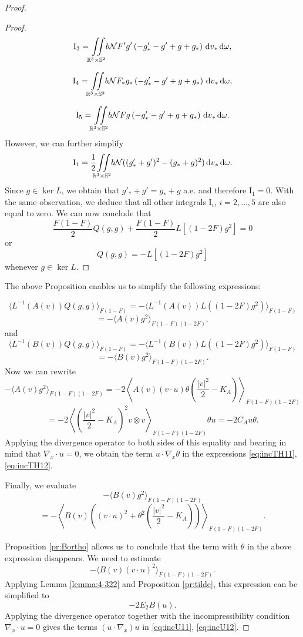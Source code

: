 \begin{proof}
\begin{proof}
    \[\mathrm I_3 = {\iint\limits_{\mathbb R^3\times\mathbb S^2}} b {\mathcal {N}} F' g'  \left(-g'_\ast-g'  +g +g_\ast\right){\,\mathrm{d} v}_\ast{\,\mathrm{d} \omega},   \]

      \[\mathrm I_4 = {\iint\limits_{\mathbb R^3\times\mathbb S^2}} b {\mathcal {N}} F_\ast g_\ast   \left(-g'_\ast-g'  +g +g_\ast\right){\,\mathrm{d} v}_\ast{\,\mathrm{d} \omega} ,  \]

        \[\mathrm I_5 = {\iint\limits_{\mathbb R^3\times\mathbb S^2}} b {\mathcal {N}} F g   \left(-g'_\ast-g'  +g +g_\ast\right){\,\mathrm{d} v}_\ast{\,\mathrm{d} \omega} .  \]
However, we can further simplify 
 \[\mathrm I_1 = \frac 12 {\iint\limits_{\mathbb R^3\times\mathbb S^2}} b {\mathcal {N}} (  (g'_\ast+g')^2 -(g _\ast+ g)^2){\,\mathrm{d} v}_\ast{\,\mathrm{d} \omega}.   \]
Since $g\in \ker L$, we obtain that $ g'_\ast+g'  = g _\ast+ g $ a.e. and therefore $\mathrm I_1=0$.
With the same observation, we deduce that all other integrals $\mathrm I_i$, $i=2,\ldots,5$ are also equal to zero.
 We can now conclude that 
 \[\frac {F(1-F)}{2}Q(g,g)+\frac {F(1-F)}{2}L[(1-2F)g^2]=0\]
 or \[ Q(g,g)=- L[(1-2F)g^2]\]
 whenever $g\in\ker L$.
\end{proof}
 
 The above Proposition enables us to simplify the following expressions:

\[\langle  L^{-1}(A(v)) Q (g ,g )\rangle_{F(1-F)}=-\langle  L^{-1}(A(v)) L
((1-2F)g^2 )\rangle_{F(1-F)}\]
\[=-\langle    A(v)    g^2 \rangle_{F(1-F)(1-2F)},\]
and
\[\langle  L^{-1}(B(v)) Q (g ,g )\rangle_{F(1-F)}=-\langle  L^{-1}(B(v)) L
((1-2F)g^2 )\rangle_{F(1-F)}\]
\[=-\langle    B(v)    g^2 \rangle_{F(1-F)(1-2F)}.\]
Now we can rewrite
\[-\langle    A(v)    g^2 \rangle_{F(1-F)(1-2F)}=-2 \left\langle    A(v)   
(v\cdot u)\theta\left(\frac{|v|^2}{2}-K_A\right) \right\rangle_{F(1-F)(1-2F)}\]
\[=-2 \left\langle   \left(\frac{|v|^2}{2}-K_A\right)^2 v\otimes v
\right\rangle_{F(1-F)(1-2F)}\theta u=-2C_Au\theta.\]
Applying the divergence operator to both sides of this equality and bearing in mind that $\nabla_x\cdot u=0$, we obtain the term $u\cdot\nabla_x\theta$ in
the expressions \eqref{eq:incTH11}, \eqref{eq:incTH12}.

Finally, we evaluate
\[  -\langle    B(v)    g^2 \rangle_{F(1-F)(1-2F)}\]\[ =-\left\langle    B(v)   
\left((v\cdot u)^2+\theta^2\left(\frac{|v|^2}{2}-K_A\right)\right)
\right\rangle_{F(1-F)(1-2F)}.\]
 
Proposition \ref{pr:Bortho} allows us to conclude that the term with
$\theta$ in the above expression %
 disappears. We need to  estimate
\[-\langle    B(v)     (v\cdot u)^2  \rangle_{F(1-F)(1-2F)}.\]
Applying Lemma  \ref{lemma:4-322} and Proposition \ref{pr:tilde}, this expression can be simplified to
\[-2 E_{2}B(u).\]
Applying the divergence operator together with the incompressibility condition $\nabla_x \cdot u=0$ gives the terms $(u\cdot\nabla_x)u$ in
 \eqref{eq:incU11}, \eqref{eq:incU12}.
\end{proof}

